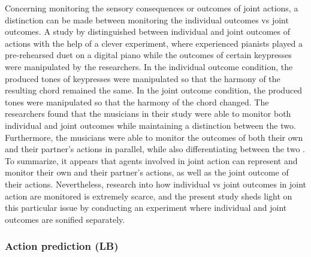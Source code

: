 \documentclass[10pt,a4paper,onecolumn]{article}
\begin{document}
Concerning monitoring the sensory consequences or outcomes of joint actions, a distinction can be made between monitoring the individual outcomes vs joint outcomes. A study by \textcite{loehrMonitoringIndividualJoint2013} distinguished between individual and joint outcomes of actions with the help of a clever experiment, where experienced pianists played a pre-rehearsed duet on a digital piano while the outcomes of certain keypresses were manipulated by the researchers. In the individual outcome condition, the produced tones of keypresses were manipulated so that the harmony of the resulting chord remained the same. In the joint outcome condition, the produced tones were manipulated so that the harmony of the chord changed. The researchers found that the musicians in their study were able to monitor both individual and joint outcomes while maintaining a distinction between the two. Furthermore, the musicians were able to monitor the outcomes of both their own and their partner's actions in parallel, while also differentiating between the two \autocite{loehrMonitoringIndividualJoint2013}. To summarize, it appears that agents involved in joint action can represent and monitor their own and their partner's actions, as well as the joint outcome of their actions. Nevertheless, research into how individual vs joint outcomes in joint action are monitored is extremely scarce, and the present study sheds light on this particular issue by conducting an experiment where individual and joint outcomes are sonified separately.

\hypertarget{action-prediction-lb}{%
\subsubsection{Action prediction (LB)}\label{action-prediction-lb}}
\end{document}

